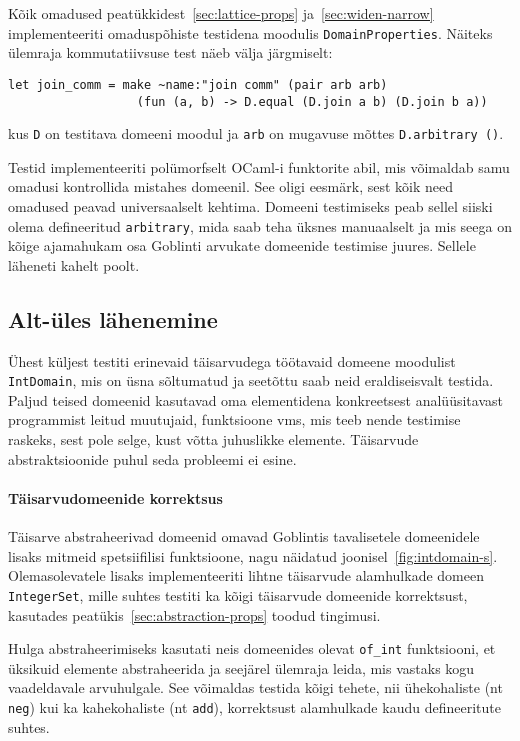 \documentclass[../thesis.tex]{subfiles}
\begin{document}
Kõik omadused peatükkidest~\ref{sec:lattice-props} ja~\ref{sec:widen-narrow} implementeeriti omaduspõhiste testidena moodulis \texttt{DomainProperties}. Näiteks ülemraja kommutatiivsuse test näeb välja järgmiselt:
\begin{verbatim}
let join_comm = make ~name:"join comm" (pair arb arb)
                  (fun (a, b) -> D.equal (D.join a b) (D.join b a))
\end{verbatim}
kus \texttt{D} on testitava domeeni moodul ja \texttt{arb} on mugavuse mõttes \texttt{D.arbitrary ()}.

Testid implementeeriti polümorfselt OCaml-i funktorite abil, mis võimaldab samu omadusi kontrollida mistahes domeenil. See oligi eesmärk, sest kõik need omadused peavad universaalselt kehtima. Domeeni testimiseks peab sellel siiski olema defineeritud \texttt{arbitrary}, mida saab teha üksnes manuaalselt ja mis seega on kõige ajamahukam osa Goblinti arvukate domeenide testimise juures. Sellele läheneti kahelt poolt.

\subsection{Alt-üles lähenemine}
Ühest küljest testiti erinevaid täisarvudega töötavaid domeene moodulist \texttt{IntDomain}, mis on üsna sõltumatud ja seetõttu saab neid eraldiseisvalt testida. Paljud teised domeenid kasutavad oma elementidena konkreetsest analüüsitavast programmist leitud muutujaid, funktsioone vms, mis teeb nende testimise raskeks, sest pole selge, kust võtta juhuslikke elemente. Täisarvude abstraktsioonide puhul seda probleemi ei esine.

\paragraph{Täisarvudomeenide korrektsus}
Täisarve abstraheerivad domeenid omavad Goblintis tavalisetele domeenidele lisaks mitmeid spetsiifilisi funktsioone, nagu näidatud joonisel~\ref{fig:intdomain-s}.
Olemasolevatele lisaks implementeeriti lihtne täisarvude alamhulkade domeen \texttt{IntegerSet}, mille suhtes testiti ka kõigi täisarvude domeenide korrektsust, kasutades peatükis~\ref{sec:abstraction-props} toodud tingimusi.

Hulga abstraheerimiseks kasutati neis domeenides olevat \texttt{of\_int} funktsiooni, et üksikuid elemente abstraheerida ja seejärel ülemraja leida, mis vastaks kogu vaadeldavale arvuhulgale. See võimaldas testida kõigi tehete, nii ühekohaliste (nt \texttt{neg}) kui ka kahekohaliste (nt \texttt{add}), korrektsust alamhulkade kaudu defineeritute suhtes.
\end{document}
